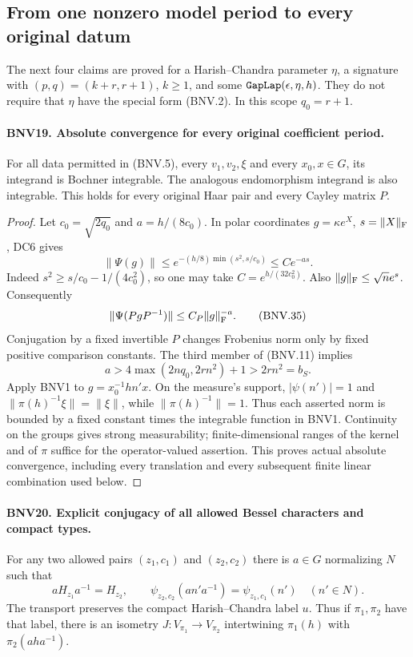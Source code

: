\documentclass[11pt,a4paper]{article}
\numberwithin{equation}{section}
\theoremstyle{remark}\newtheorem{remark}[theorem]{Remark}
\begin{document}
\subsection{From one nonzero model period to every original datum}

The next four claims are proved for a Harish--Chandra parameter $\eta$,
a signature with $(p,q)=(k+r,r+1)$, $k\ge1$, and some
$\texttt{Gap\allowbreak Lap}(\epsilon,\eta,h)$.  They do not require that $\eta$
have the special form (BNV.2).  In this scope $q_0=r+1$.

\paragraph{BNV19. Absolute convergence for every original coefficient period.}
\label{claim:BNV19}
For all data permitted in (BNV.5), every $v_1,v_2,\xi$ and every
$x_0,x\in G$, its integrand is Bochner integrable.  The analogous
endomorphism integrand is also integrable.  This holds for every original
Haar pair and every Cayley matrix $P$.

\begin{proof}
Let $c_0=\sqrt{2q_0}$ and $a=h/(8c_0)$.  In polar coordinates
$g=\kappa e^X$, $s=\|X\|_{\rm F}$, DC6 gives
\[
 \|\Psi(g)\|\le e^{-(h/8)\min(s^2,s/c_0)}
                 \le C e^{-as}.
\]
Indeed $s^2\ge s/c_0-1/(4c_0^2)$, so one may take
$C=e^{h/(32c_0^2)}$.  Also $\|g\|_{\rm F}\le\sqrt n e^s$.
Consequently
\[
 \|\Psi(PgP^{-1})\|\le C_P\|g\|_{\rm F}^{-a}.
 \tag{BNV.35}
\]
Conjugation by a fixed invertible $P$ changes Frobenius norm only by
fixed positive comparison constants.  The third member of (BNV.11)
implies
\[
 a>4\max(2nq_0,2rn^2)+1>2rn^2=b_S.
\]
Apply BNV1 to $g=x_0^{-1}hn'x$.  On the measure's support,
$|\psi(n')|=1$ and $\|\pi(h)^{-1}\xi\|=\|\xi\|$, while
$\|\pi(h)^{-1}\|=1$.  Thus each asserted norm is bounded by a fixed
constant times the integrable function in BNV1.  Continuity on the
groups gives strong measurability; finite-dimensional ranges of the
kernel and of $\pi$ suffice for the operator-valued assertion.
This proves actual absolute convergence, including every translation
and every subsequent finite linear combination used below.
\end{proof}

\paragraph{BNV20. Explicit conjugacy of all allowed Bessel characters and compact types.}
\label{claim:BNV20}
For any two allowed pairs $(z_1,c_1)$ and $(z_2,c_2)$ there is
$a\in G$ normalizing $N$ such that
\[
 aH_{z_1}a^{-1}=H_{z_2},\qquad
 \psi_{z_2,c_2}(an'a^{-1})=\psi_{z_1,c_1}(n')\quad(n'\in N).
 \tag{BNV.36}
\]
The transport preserves the compact Harish--Chandra label $u$.
Thus if $\pi_1,\pi_2$ have that label, there is an isometry
$J:V_{\pi_1}\to V_{\pi_2}$ intertwining
$\pi_1(h)$ with $\pi_2(aha^{-1})$.
\end{document}
